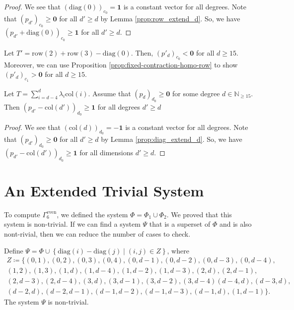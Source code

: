   
\begin{proof}
    We see that \( (\mathrm{diag}(0))_{c_0} = \mathbf 1 \) is a constant vector for all degrees. Note that \( (p_{d'})_{c_0} \geq \mathbf 0 \) for all \( d' \geq d \) by Lemma \ref{prop:row_extend_d}. So, we have \( (p_{d'} + \mathrm{diag}(0))_{c_0} \geq \mathbf 1 \) for all \( d' \geq d \).
\end{proof}
  
  
  
\begin{example}
    Let \( T' = \mathrm{row}(2) + \mathrm{row}(3) - \mathrm{diag}(0) \).
    Then, \( (p'_d)_{c_0} < \mathbf{0} \) for all \( d \geq 15 \). Moreover, we can use Proposition \ref{prop:fixed-contraction-homo-row} to show \( (p'_d)_{c_1} > \mathbf{0} \) for all \( d \geq 15 \).
  \end{example}

\begin{proposition}\label{prop:col_homo_d_zero_diag}
Let \( T = \sum_{i=d-4}^d \lambda_i \mathrm{col}(i)\). Assume that \( (p_d)_{d_0} \geq \mathbf{0} \) for some degree \( d \in \mathbb{N}_{\geq 15} \). Then \( (p_{d'} - \mathrm{col}(d'))_{d_0} \geq \mathbf 1 \) for all degrees \( d' \geq d \)
\end{proposition}
  
\begin{proof}
We see that \( (\mathrm{col}(d))_{d_0} = -\mathbf 1 \) is a constant vector for all degrees. Note that \( (p_{d'})_{d_0} \geq \mathbf 0 \) for all \( d' \geq d \) by Lemma \ref{prop:diag_extend_d}. So, we have \( (p_{d'} - \mathrm{col}(d'))_{d_0} \geq \mathbf 1 \) for all dimensions \( d' \geq d \).
\end{proof}
  



\section{An Extended Trivial System}

To compute \(  \Gamma^{\mathrm{even}}_6 \), we defined the system \( \Phi = \Phi_1 \cup \Phi_2 \). We proved that this system is non-trivial. If we can find a system \( \Psi \) that is a superset of \( \Phi \) and is also nont-rivial, then we can reduce the number of cases to check. 

\begin{proposition}
    Define \( \Psi = \Phi \cup \left\{ \mathrm{diag}(i) - \mathrm{diag}(j) \mid (i,j) \in Z \right\} \), where 
    \begin{gather*}
        Z \coloneqq \{ (0,1), (0,2), (0,3), (0,4), (0,d-1), (0,d-2), (0,d-3), (0,d-4),\\ (1,2), (1,3), (1, d), (1,d-4), (1,d-2), (1,d-3), (2,d), (2,d-1),\\ (2,d-3), (2, d-4), (3,d), (3,d-1), (3,d-2), (3, d-4)
        (d-4,d), (d-3,d),\\ (d-2,d), (d-2,d-1), (d-1,d-2), (d-1,d-3), (d-1,d), (1, d-1)\}.
    \end{gather*}
    The system \( \Psi \) is non-trivial.
\end{proposition}

